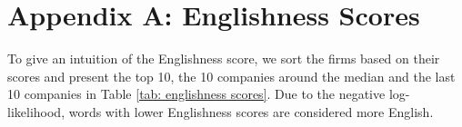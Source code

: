 \documentclass[11pt]{article}
\begin{document}
\newpage
\section*{Appendix A: Englishness Scores}\label{Appendix A}
To give an intuition of the Englishness score, we sort the firms based on their scores and present the top 10, the 10 companies around the median and the last 10 companies in Table \ref{tab: englishness scores}. Due to the negative log-likelihood, words with lower Englishness scores are considered more English.

\vspace{1cm}
\begin{center}
\begin{table}[h]
\caption{Examples of the Englishness score}
\label{tab: englishness scores}
\end{table}
\end{center}
\end{document}
